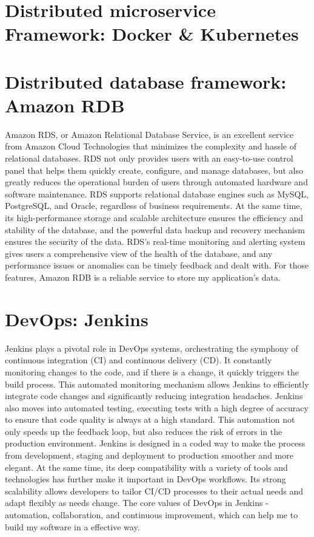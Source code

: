 \documentclass[12pt,two side]{report}
\begin{document}
\section{Distributed microservice Framework: Docker \& Kubernetes}
\section{Distributed database framework: Amazon RDB}
Amazon RDS, or Amazon Relational Database Service, is an excellent service from Amazon Cloud Technologies that minimizes the complexity and hassle of relational databases. RDS not only provides users with an easy-to-use control panel that helps them quickly create, configure, and manage databases, but also greatly reduces the operational burden of users through automated hardware and software maintenance. RDS supports relational database engines such as MySQL, PostgreSQL, and Oracle, regardless of business requirements. At the same time, its high-performance storage and scalable architecture ensures the efficiency and stability of the database, and the powerful data backup and recovery mechanism ensures the security of the data. RDS's real-time monitoring and alerting system gives users a comprehensive view of the health of the database, and any performance issues or anomalies can be timely feedback and dealt with. For those features, Amazon RDB is a reliable service to store my application's data. 
\section{DevOps: Jenkins}
Jenkins plays a pivotal role in DevOps systems, orchestrating the symphony of continuous integration (CI) and continuous delivery (CD). It constantly monitoring changes to the code, and if there is a change, it quickly triggers the build process. This automated monitoring mechanism allows Jenkins to efficiently integrate code changes and significantly reducing integration headaches. Jenkins also moves into automated testing, executing tests with a high degree of accuracy to ensure that code quality is always at a high standard. This automation not only speeds up the feedback loop, but also reduces the risk of errors in the production environment. Jenkins is designed in a coded way to make the process from development, staging and deployment to production smoother and more elegant. At the same time, its deep compatibility with a variety of tools and technologies has further make it important in DevOps workflows. Its strong scalability allows developers to tailor CI/CD processes to their actual needs and adapt flexibly as needs change. The core values of DevOps in Jenkins - automation, collaboration, and continuous improvement, which can help me to build my software in a effective way.
\end{document}
